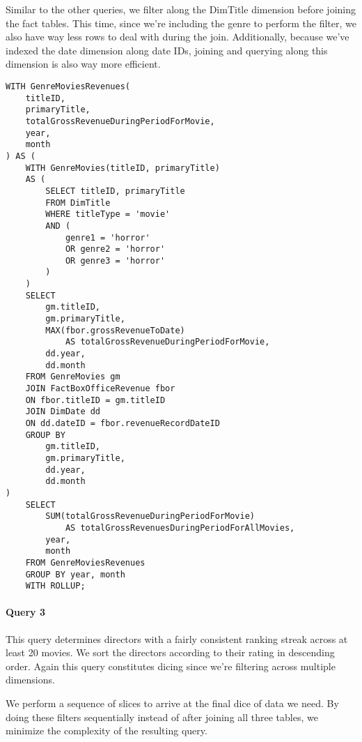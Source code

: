 Similar to the other queries, we filter along the DimTitle dimension before joining the fact tables. This time, since we’re including the genre to perform the filter, we also have way less rows to deal with during the join. Additionally, because we’ve indexed the date dimension along date IDs, joining and querying along this dimension is also way more efficient.
\begin{lstlisting}
WITH GenreMoviesRevenues(
    titleID, 
    primaryTitle, 
    totalGrossRevenueDuringPeriodForMovie, 
    year, 
    month
) AS (
    WITH GenreMovies(titleID, primaryTitle) 
    AS (
        SELECT titleID, primaryTitle
        FROM DimTitle
        WHERE titleType = 'movie'
        AND (
            genre1 = 'horror'
            OR genre2 = 'horror'
            OR genre3 = 'horror'
        )
    )
    SELECT 
        gm.titleID, 
        gm.primaryTitle, 
        MAX(fbor.grossRevenueToDate) 
            AS totalGrossRevenueDuringPeriodForMovie, 
        dd.year, 
        dd.month
    FROM GenreMovies gm
    JOIN FactBoxOfficeRevenue fbor
    ON fbor.titleID = gm.titleID
    JOIN DimDate dd
    ON dd.dateID = fbor.revenueRecordDateID
    GROUP BY 
        gm.titleID, 
        gm.primaryTitle, 
        dd.year, 
        dd.month
)
    SELECT 
        SUM(totalGrossRevenueDuringPeriodForMovie) 
            AS totalGrossRevenuesDuringPeriodForAllMovies, 
        year, 
        month
    FROM GenreMoviesRevenues
    GROUP BY year, month
    WITH ROLLUP;
\end{lstlisting}

\paragraph{Query 3}
This query determines directors with a fairly consistent ranking streak across at least 20 movies. We sort the directors according to their rating in descending order. Again this query constitutes dicing since we’re filtering across multiple dimensions.

We perform a sequence of slices to arrive at the final dice of data we need. By doing these filters sequentially instead of after joining all three tables, we minimize the complexity of the resulting query.

